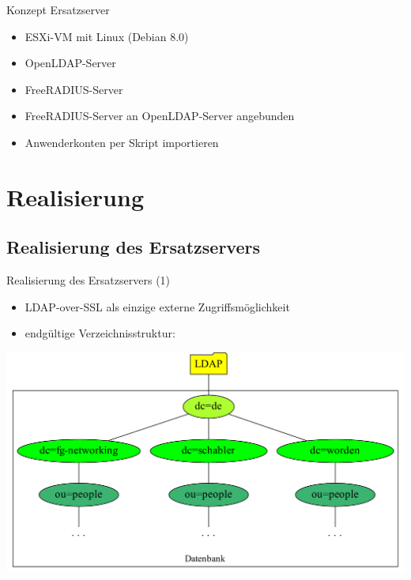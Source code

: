 \documentclass[presentation,svgnames,12pt]{beamer}
\begin{document}
\begin{frame}{Konzept Ersatzserver}
\begin{itemize}
	\item ESXi-VM mit Linux (Debian 8.0)
	\item OpenLDAP-Server%
	\item FreeRADIUS-Server%
	\item FreeRADIUS-Server an OpenLDAP-Server angebunden%
	\item Anwenderkonten per Skript importieren
\end{itemize}
\end{frame}


\section{Realisierung}
\subsection{Realisierung des Ersatzservers}
\begin{frame}{Realisierung des Ersatzservers (1)}
\begin{itemize}
	\item LDAP-over-SSL als einzige externe Zugriffsmöglichkeit
	\item endgültige Verzeichnisstruktur: %
\end{itemize}
\centering
\includegraphics[width=\textwidth]{Bilder/LDAP-fgn.pdf}
\end{frame}
\end{document}
